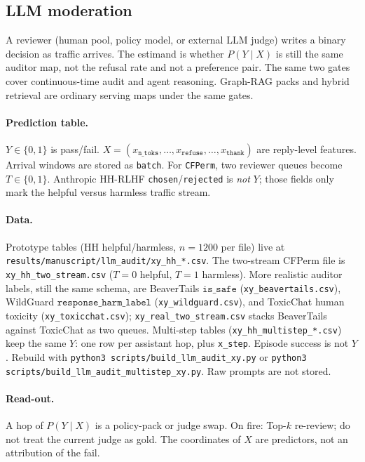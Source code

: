 \subsection{LLM moderation}
\label{sec:usecase-llm-audit}
A reviewer (human pool, policy model, or external LLM judge) writes a binary decision as traffic arrives.
The estimand is whether \(P(Y\mid X)\) is still the same auditor map, not the refusal rate and not a preference pair.
The same two gates cover continuous-time audit and agent reasoning.
Graph-RAG packs and hybrid retrieval are ordinary serving maps under the same gates.

\paragraph{Prediction table.}
\(Y\in\{0,1\}\) is pass/fail.
\(X=(x_{\texttt{n\_toks}},\ldots,x_{\texttt{refuse}},\ldots,x_{\texttt{thank}})\) are reply-level features.
Arrival windows are stored as \texttt{batch}.
For \texttt{CFPerm}, two reviewer queues become \(T\in\{0,1\}\).
Anthropic HH-RLHF \texttt{chosen}/\texttt{rejected} is \emph{not} \(Y\); those fields only mark the helpful versus harmless traffic stream.

\paragraph{Data.}
Prototype tables (HH helpful/harmless, \(n=1200\) per file) live at
\texttt{results/manuscript/llm\_audit/xy\_hh\_*.csv}.
The two-stream CFPerm file is \texttt{xy\_hh\_two\_stream.csv} (\(T=0\) helpful, \(T=1\) harmless).
More realistic auditor labels, still the same schema, are
BeaverTails \(\texttt{is\_safe}\) (\texttt{xy\_beavertails.csv}),
WildGuard \(\texttt{response\_harm\_label}\) (\texttt{xy\_wildguard.csv}),
and ToxicChat human toxicity (\texttt{xy\_toxicchat.csv});
\texttt{xy\_real\_two\_stream.csv} stacks BeaverTails against ToxicChat as two queues.
Multi-step tables (\texttt{xy\_hh\_multistep\_*.csv}) keep the same \(Y\): one row per assistant hop, plus \texttt{x\_step}.
Episode success is not \(Y\). Rebuild with \texttt{python3 scripts/build\_llm\_audit\_xy.py}
or \texttt{python3 scripts/build\_llm\_audit\_multistep\_xy.py}.
Raw prompts are not stored.

\paragraph{Read-out.}
A hop of \(P(Y\mid X)\) is a policy-pack or judge swap.
On fire: Top-\(k\) re-review; do not treat the current judge as gold.
The coordinates of \(X\) are predictors, not an attribution of the fail.

